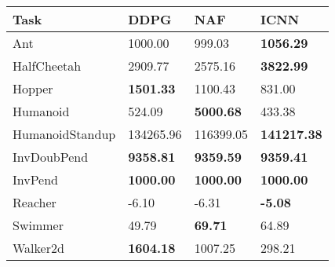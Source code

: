 \begin{tabular}[c]{@{}llll@{}}
Task & DDPG & NAF & ICNN \\ \hline
Ant & 1000.00 & 999.03 & \textbf{1056.29} \\
HalfCheetah & 2909.77 & 2575.16 & \textbf{3822.99} \\
Hopper & \textbf{1501.33} & 1100.43 & 831.00 \\
Humanoid & 524.09 & \textbf{5000.68} & 433.38 \\
HumanoidStandup & 134265.96 & 116399.05 & \textbf{141217.38} \\
InvDoubPend & \textbf{9358.81} & \textbf{9359.59} & \textbf{9359.41} \\
InvPend & \textbf{1000.00} & \textbf{1000.00} & \textbf{1000.00} \\
Reacher & -6.10 & -6.31 & \textbf{-5.08} \\
Swimmer & 49.79 & \textbf{69.71} & 64.89 \\
Walker2d & \textbf{1604.18} & 1007.25 & 298.21 \\
\end{tabular}
